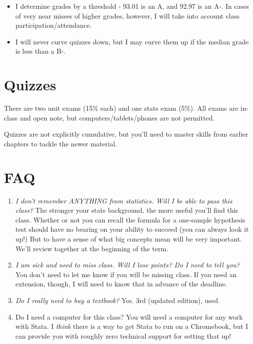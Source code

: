 \documentclass[11pt]{article}
\begin{document}
\begin{itemize}
\item
  I determine grades by a threshold - 93.01 is an A, and 92.97 is an A-.
  In cases of very near misses of higher grades, however, I will take
  into account class participation/attendance.
\item
  I will never curve quizzes down, but I may curve them up if the median
  grade is less than a B-.
\end{itemize}

\hypertarget{quizzes}{%
\section*{Quizzes}\label{quizzes}}

There are two unit exams (15\% each) and one stats exam (5\%). All exams
are in-class and open note, but computers/tablets/phones are not
permitted.

Quizzes are not explicitly cumulative, but you'll need to master skills
from earlier chapters to tackle the newer material.

\hypertarget{frequently-asked-questions}{%
\section*{FAQ}\label{frequently-asked-questions}}

\begin{enumerate}
\def\labelenumi{\arabic{enumi}.}
\item
  \emph{I don't remember ANYTHING from statistics. Will I be able to
  pass this class?} The stronger your stats background, the more useful
  you'll find this class. Whether or not you can recall the formula for
  a one-sample hypothesis test should have no bearing on your ability to
  succeed (you can always look it up!) But to have a sense of what big
  concepts mean will be very important. We'll review together at the
  beginning of the term.
\item
  \emph{I am sick and need to miss class. Will I lose points? Do I need
  to tell you?} You don't need to let me know if you will be missing
  class. If you need an extension, though, I will need to know that in
  advance of the deadline.
\item
  \emph{Do I really need to buy a textbook?} Yes. 3rd (updated edition),
  used.
\item
  Do I need a computer for this class? You will need a computer for any
  work with Stata. I \emph{think} there is a way to get Stata to run on
  a Chromebook, but I can provide you with roughly zero technical
  support for setting that up!
\end{enumerate}
\end{document}
